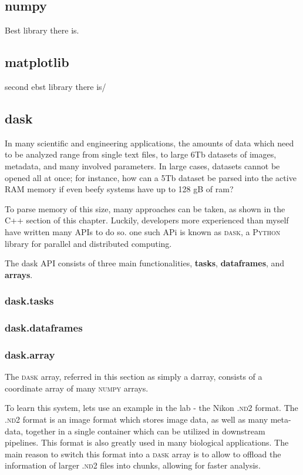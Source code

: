 \subsection{numpy}

Best library there is.

\subsection{matplotlib}

second ebst library there is/ 

\subsection{dask}

In many scientific and engineering applications, the amounts of data which need to be analyzed range from single text files, to large 6Tb datasets of images, metadata, and many involved parameters. In large cases, datasets cannot be opened all at once; for instance, how can a 5Tb dataset be parsed into the active RAM memory if even beefy systems have up to 128 gB of ram?

To parse memory of this size, many approaches can be taken, as shown in the C++ section of this chapter. Luckily, developers more experienced than myself have written many APIs to do so. one such APi is known as \textsc{dask}, a \textsc{Python} library for parallel and distributed computing.

The dask API consists of three main functionalities, \textbf{tasks}, \textbf{dataframes}, and \textbf{arrays}.

\subsubsection{dask.tasks}

\subsubsection{dask.dataframes}

\subsubsection{dask.array}

The \textsc{dask} array, referred in this section as simply a darray, consists of a coordinate array of many \textsc{numpy} arrays. 

To learn this system, lets use an example in the lab - the Nikon \textsc{.nd2} format. The \textsc{.nd2} format is an image format which stores image data, as well as many meta-data, together in a single container which can be utilized in downstream pipelines. This format is also greatly used in many biological applications. The main reason to switch this format into a  \textsc{dask} array is to allow to offload the information of larger  \textsc{.nd2} files into chunks, allowing for faster analysis.


